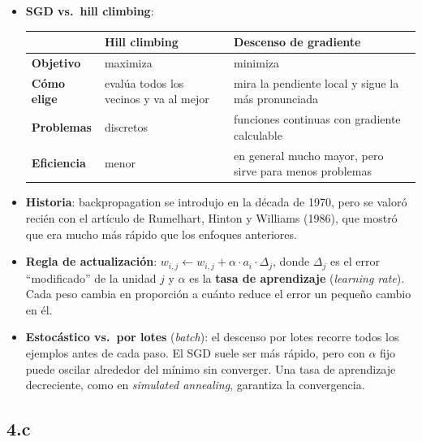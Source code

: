 \documentclass[11pt,a4paper]{article}
\begin{document}
\begin{extras}
\begin{itemize}
  \item \textbf{SGD vs.\ hill climbing}:
  \begin{center}\small
  \begin{tabularx}{0.92\linewidth}{@{}>{\bfseries}l X X@{}}
  \toprule
   & \textbf{Hill climbing} & \textbf{Descenso de gradiente} \\
  \midrule
  Objetivo & maximiza & minimiza \\
  Cómo elige & evalúa todos los vecinos y va al mejor & mira la pendiente local y sigue la más pronunciada \\
  Problemas & discretos & funciones continuas con gradiente calculable \\
  Eficiencia & menor & en general mucho mayor, pero sirve para menos problemas \\
  \bottomrule
  \end{tabularx}
  \end{center}
  \item \textbf{Historia}: backpropagation se introdujo en la década de 1970, pero se valoró recién con el artículo de Rumelhart, Hinton y Williams (1986), que mostró que era mucho más rápido que los enfoques anteriores.
  \item \textbf{Regla de actualización}: $w_{i,j} \leftarrow w_{i,j} + \alpha \cdot a_i \cdot \Delta_j$, donde $\Delta_j$ es el error ``modificado'' de la unidad $j$ y $\alpha$ es la \textbf{tasa de aprendizaje} (\textit{learning rate}). Cada peso cambia en proporción a cuánto reduce el error un pequeño cambio en él.
  \item \textbf{Estocástico vs.\ por lotes} (\textit{batch}): el descenso por lotes recorre todos los ejemplos antes de cada paso. El SGD suele ser más rápido, pero con $\alpha$ fijo puede oscilar alrededor del mínimo sin converger. Una tasa de aprendizaje decreciente, como en \textit{simulated annealing}, garantiza la convergencia.
\end{itemize}
\end{extras}

\subsection{4.c}
\end{document}
